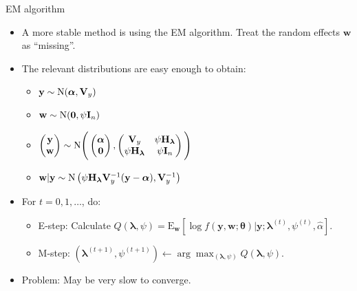 \documentclass{beamer}\usepackage[]{graphicx}\usepackage[]{color}
\newcommand{\N}{\text{\normalfont N}}
\begin{document}
\begin{frame}{EM algorithm}
	\begin{itemize}
		\item A more stable method is using the EM algorithm. Treat the random effects $\mathbf w$ as ``missing''.
		\item The relevant distributions are easy enough to obtain:
		\begin{itemize}
			\item $\mathbf y \sim \N(\boldsymbol\alpha, \mathbf V_y)$ \vspace{1pt}
			\item $\mathbf w \sim \N(\mathbf 0, \psi\mathbf I_n)$ \vspace{3pt}
			\item $\begin{pmatrix}\mathbf y \\ \mathbf w\end{pmatrix} \sim \N\Bigg(\begin{pmatrix}\boldsymbol\alpha\\\mathbf 0\end{pmatrix}, \begin{pmatrix} \mathbf V_y & \mathbf \psi \mathbf H_{\boldsymbol\lambda} \\ \psi\mathbf H_{\boldsymbol\lambda} & \psi\mathbf I_n \end{pmatrix}\Bigg)$ \vspace{2pt}
			\item $\mathbf w | \mathbf y \sim \N\left(\psi\mathbf H_{\boldsymbol\lambda} \mathbf V_y^{-1} (\mathbf y - \boldsymbol\alpha), \mathbf V_y^{-1}\right)$
		\end{itemize}

		\item For $t = 0, 1, \dots$, do:
		\begin{itemize}
			\item E-step: Calculate $Q(\boldsymbol\lambda, \psi) = \text{E}_{\mathbf w} \left[\log f(\mathbf y, \mathbf w ; \boldsymbol\theta)  | \mathbf y; \boldsymbol\lambda^{(t)}, \psi^{(t)}, \hat\alpha \right]$.

			\item M-step: $(\boldsymbol\lambda^{(t+1)}, \psi^{(t+1)}) \gets \arg\max_{(\boldsymbol\lambda, \psi)} Q(\boldsymbol\lambda, \psi)$.
		\end{itemize}


		\item Problem: May be very slow to converge.
	\end{itemize}
\end{frame}
\end{document}
